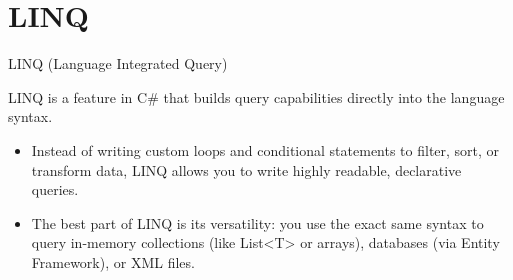 
\section{LINQ}


\begin{frame}{LINQ (Language Integrated Query)}

  LINQ is a feature in C\# that builds query capabilities directly into the language syntax.

  \begin{itemize}
    \item Instead of writing custom loops and conditional statements to filter, sort, or transform data, LINQ allows you to write highly readable, declarative queries. 
    \item The best part of LINQ is its versatility: you use the exact same syntax to query in-memory collections (like List<T> or arrays), databases (via Entity Framework), or XML files.
  \end{itemize}

\end{frame}